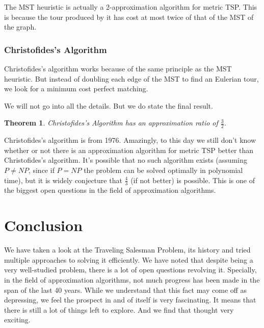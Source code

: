 \documentclass[12pt]{article}
\newtheorem{theorem}{Theorem}
\begin{document}
The MST heuristic is actually a 2-approximation algorithm for metric TSP. This is because the tour produced by it has cost at most twice of that of the MST of the graph.

\subsubsection{ Christofides’s Algorithm}

Christofides's algorithm works because of the same principle as the MST heuristic. But instead of doubling each edge of the MST to find an Eulerian tour, we look for a minimum cost perfect matching.

We will not go into all the details. But we do state the final result.

\begin{theorem}
    Christofides's Algorithm has an approximation ratio of \(\frac{3}{2}\).
\end{theorem}

Christofides’s algorithm is from 1976. Amazingly, to this day we still don’t know whether or not there is an approximation algorithm for metric TSP better than Christofides’s algorithm. It’s possible that no such algorithm exists (assuming \(P\neq NP\), since if \(P = NP\) the
problem can be solved optimally in polynomial time), but it is widely conjecture that \(\frac{4}{3}\) (if not better) is possible. This is one of the biggest open questions in the field of approximation algorithms.

\section{Conclusion}

We have taken a look at the Traveling Salesman Problem, its history and tried multiple approaches to solving it efficiently. We have noted that despite being a very well-studied problem, there is a lot of open questions revolving it. Specially, in the field of approximation algorithms, not much progress has been made in the span of the last 40 years. While we understand that this fact may come off as depressing, we feel the prospect in and of itself is very fascinating. It means that there is still a lot of things left to explore. And we find that thought very exciting. 
\end{document}
